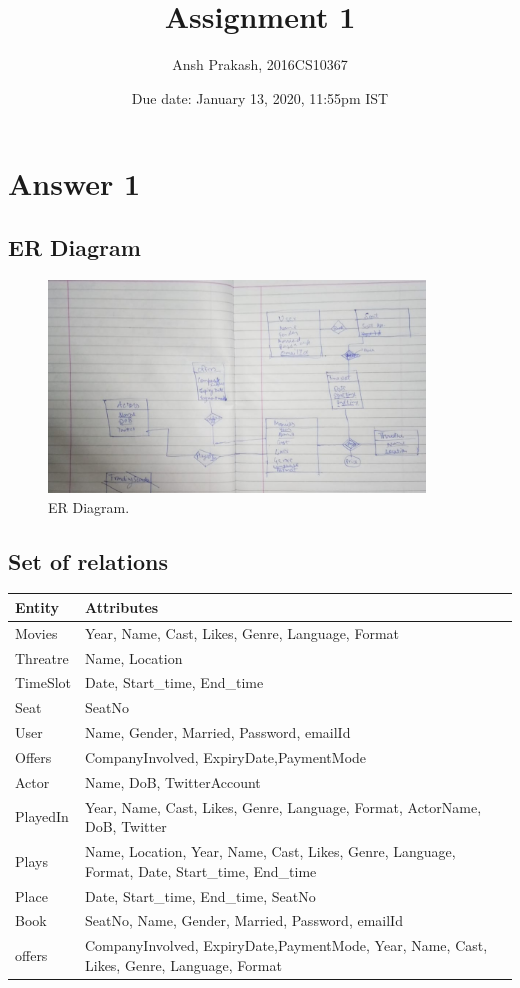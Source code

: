 \documentclass[10pt]{article}
\title{Assignment 1}
\author {Ansh Prakash, 2016CS10367}
\date{Due date: January 13, 2020, 11:55pm IST}
\begin{document}
\maketitle

\section{Answer 1}
\subsection{ER Diagram}
\begin{figure}[h]
  \includegraphics[width=10cm]{ER.jpeg}
  \caption{ER Diagram.}
  \label{fig:boat1}
\end{figure}


\subsection{Set of relations}

\begin{center}
 \begin{tabular}{| m{6em} | m{8cm}|} 
 \hline
 Entity & Attributes \\ [1ex] 
 \hline
 Movies & Year, Name, Cast, Likes, Genre, Language, Format \\
 Threatre & Name, Location \\
 TimeSlot & Date, Start\_time, End\_time \\
 Seat & SeatNo \\
 User & Name, Gender, Married, Password, emailId \\
 Offers & CompanyInvolved, ExpiryDate,PaymentMode \\
 Actor & Name, DoB, TwitterAccount \\

 PlayedIn & Year, Name, Cast, Likes, Genre, Language, Format, ActorName, DoB, Twitter \\
 Plays & Name, Location, Year, Name, Cast, Likes, Genre, Language, Format, Date, Start\_time, End\_time  \\
 Place & Date, Start\_time, End\_time, SeatNo \\
 Book & SeatNo, Name, Gender, Married, Password, emailId \\
 offers & CompanyInvolved, ExpiryDate,PaymentMode, Year, Name, Cast, Likes, Genre, Language, Format \\
 
 \hline
 
\end{tabular}
\end{center}
\end{document}
